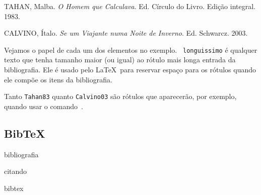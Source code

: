 \begin{thebibliography}{longuissimo}
 TAHAN, Malba. \emph{O Homem que
Calculava}. Ed. Círculo do Livro. Edição integral. 1983.

 CALVINO, Ítalo. 
\emph{Se um Viajante numa Noite de Inverno}. Ed. Schwarcz. 2003.
\end{thebibliography}

Vejamos o papel de cada um dos elementos no exemplo. {\tt
  longuissimo} é qualquer texto que tenha tamanho maior (ou igual) ao
rótulo mais longa entrada da bibliografia. Ele é usado pelo
\LaTeX\ para reservar espaço para os rótulos quando ele compõe os
itens da bibliografia.

Tanto {\tt Tahan83} quanto {\tt Calvino03} são rótulos que aparecerão,
por exemplo, quando usar o comando~.

\subsection{Bib\TeX}


bibliografia

citando

bibtex
